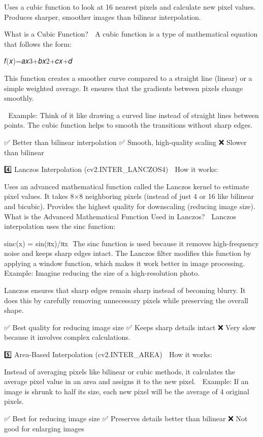 Uses a cubic function to look at 16 nearest pixels and calculate new pixel values.
Produces sharper, smoother images than bilinear interpolation.

What is a Cubic Function? 🤔
A cubic function is a type of mathematical equation that follows the form:

𝑓(𝑥)=𝑎𝑥3+𝑏𝑥2+𝑐𝑥+𝑑

This function creates a smoother curve compared to a straight line (linear) or a simple weighted average.
It ensures that the gradients between pixels change smoothly.

🔹 Example:
Think of it like drawing a curved line instead of straight lines between points. The cubic function helps to smooth the transitions without sharp edges.

✅ Better than bilinear interpolation
✅ Smooth, high-quality scaling
❌ Slower than bilinear

4️⃣ Lanczos Interpolation (cv2.INTER_LANCZOS4)
📌 How it works:

Uses an advanced mathematical function called the Lanczos kernel to estimate pixel values.
It takes 8×8 neighboring pixels (instead of just 4 or 16 like bilinear and bicubic).
Provides the highest quality for downscaling (reducing image size).
What is the Advanced Mathematical Function Used in Lanczos? 🤔
Lanczos interpolation uses the sinc function:

sinc(x) = sin(πx)/πx
​
The sinc function is used because it removes high-frequency noise and keeps sharp edges intact.
The Lanczos filter modifies this function by applying a window function, which makes it work better in image processing.
🔹 Example:
Imagine reducing the size of a high-resolution photo.

Lanczos ensures that sharp edges remain sharp instead of becoming blurry.
It does this by carefully removing unnecessary pixels while preserving the overall shape.

✅ Best quality for reducing image size
✅ Keeps sharp details intact
❌ Very slow because it involves complex calculations.

5️⃣ Area-Based Interpolation (cv2.INTER_AREA)
📌 How it works:

Instead of averaging pixels like bilinear or cubic methods, it calculates the average pixel value in an area and assigns it to the new pixel.
🔹 Example:
If an image is shrunk to half its size, each new pixel will be the average of 4 original pixels.

✅ Best for reducing image size
✅ Preserves details better than bilinear
❌ Not good for enlarging images

